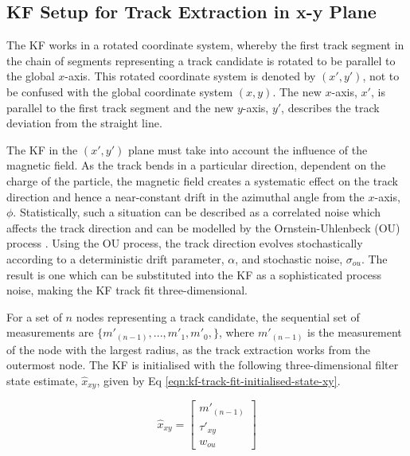 \subsection{KF Setup for Track Extraction in x-y Plane}
\label{chapter-6-derivation-part-2}

The KF works in a rotated coordinate system, whereby the first track segment in the chain of segments representing a track candidate is rotated to be parallel to the global $x$-axis. This rotated coordinate system is denoted by $(x', y')$, not to be confused with the global coordinate system $(x, y)$. The new $x$-axis, $x'$, is parallel to the first track segment and the new $y$-axis, $y'$, describes the track deviation from the straight line.

The KF in the $(x', y')$ plane must take into account the influence of the magnetic field. As the track bends in a particular direction, dependent on the charge of the particle, the magnetic field creates a systematic effect on the track direction and hence a near-constant drift in the azimuthal angle from the $x$-axis, $\phi$. Statistically, such a situation can be described as a correlated noise which affects the track direction and can be modelled by the Ornstein-Uhlenbeck (OU) process \cite{OU}. Using the OU process, the track direction evolves stochastically according to a deterministic drift parameter, $\alpha$, and stochastic noise, $\sigma_{ou}$. The result is one which can be substituted into the KF as a sophisticated process noise, making the KF track fit three-dimensional.

For a set of $n$ nodes representing a track candidate, the sequential set of measurements are $\{m'_{(n-1)}, ..., m'_1, m'_0, \}$, where $m'_{(n-1)}$ is the measurement of the node with the largest radius, as the track extraction works from the outermost node. The KF is initialised with the following three-dimensional filter state estimate, $\hat{x}_{xy}$, given by Eq \eqref{eqn:kf-track-fit-initialised-state-xy}.


\begin{equation}
\hat{x}_{xy} = \begin{bmatrix} m'_{(n-1)} \\ \tau'_{xy} \\ w_{ou} \end{bmatrix} 
\label{eqn:kf-track-fit-initialised-state-xy}
\end{equation}

